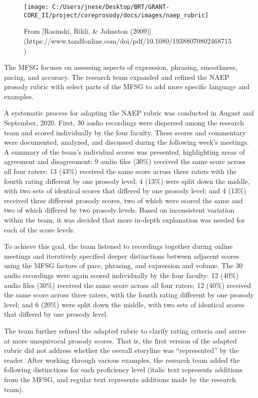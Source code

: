 \documentclass[
]{article}
\begin{document}
\begin{figure}
\texttt{[image: C:/Users/jnese/Desktop/BRT/GRANT-CORE\_II/project/coreprosody/docs/images/naep\_rubric]} \caption{From [Rasinski, Rikli, & Johnston (2009)](https://www.tandfonline.com/doi/pdf/10.1080/19388070802468715)}\label{fig:unnamed-chunk-2}
\end{figure}

The MFSG focuses on assessing aspects of expression, phrasing,
smoothness, pacing, and accuracy. The research team expanded and refined
the NAEP prosody rubric with select parts of the MFSG to add more
specific language and examples.

A systematic process for adapting the NAEP rubric was conducted in
August and September, 2020. First, 30 audio recordings were dispersed
among the research team and scored individually by the four faculty.
These scores and commentary were documented, analyzed, and discussed
during the following week's meetings. A summary of the team's individual
scores was presented, highlighting areas of agreement and disagreement:
9 audio files (30\%) received the same score across all four raters; 13
(43\%) received the same score across three raters with the fourth
rating different by one prosody level; 4 (13\%) were split down the
middle, with two sets of identical scores that differed by one prosody
level; and 4 (13\%) received three different prosody scores, two of
which were scored the same and two of which differed by two prosody
levels. Based on inconsistent variation within the team, it was decided
that more in-depth explanation was needed for each of the score levels.

To achieve this goal, the team listened to recordings together during
online meetings and iteratively specified deeper distinctions between
adjacent scores using the MFSG factors of pace, phrasing, and expression
and volume. The 30 audio recordings were again scored individually by
the four faculty: 12 (40\%) audio files (30\%) received the same score
across all four raters; 12 (40\%) received the same score across three
raters, with the fourth rating different by one prosody level; and 6
(20\%) were split down the middle, with two sets of identical scores
that differed by one prosody level.

The team further refined the adapted rubric to clarify rating criteria
and arrive at more unequivocal prosody scores. That is, the first
version of the adapted rubric did not address whether the overall
storyline was ``represented'' by the reader. After working through
various examples, the research team added the following distinctions for
each proficiency level (italic text represents additions from the MFSG,
and regular text represents additions made by the research team).
\end{document}
